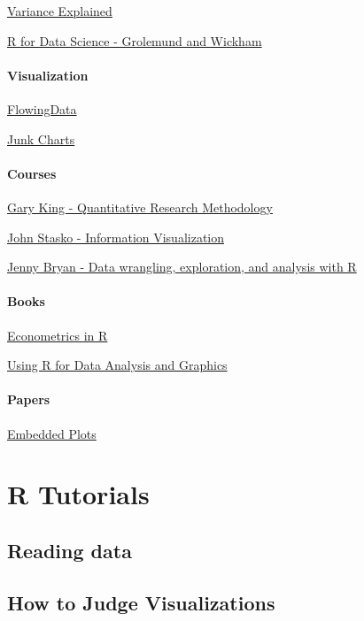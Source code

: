 \documentclass[]{book}
\begin{document}
\href{http://varianceexplained.org/RData/resources/}{Variance Explained}

\href{http://r4ds.had.co.nz/}{R for Data Science - Grolemund and
Wickham}

\subsection*{Visualization}\label{visualization}

\href{}{FlowingData}

\href{http://junkcharts.typepad.com/}{Junk Charts}

\subsection*{Courses}\label{courses}

\href{http://projects.iq.harvard.edu/gov2001/}{Gary King - Quantitative
Research Methodology}

\href{http://www.cc.gatech.edu/~stasko/7450/}{John Stasko - Information
Visualization}

\href{http://stat545.com/}{Jenny Bryan - Data wrangling, exploration,
and analysis with R}

\subsection*{Books}\label{books}

\href{https://cran.r-project.org/doc/contrib/Farnsworth-EconometricsInR.pdf}{Econometrics
in R}

\href{ftp://cran.r-project.org/pub/R/doc/contrib/usingR.pdf}{Using R for
Data Analysis and Graphics}

\subsection*{Papers}\label{papers}

\href{http://vita.had.co.nz/papers/embedded-plots.pdf}{Embedded Plots}

\part{R Tutorials}\label{part-r-tutorials}

\hypertarget{read-data}{\chapter{Reading data}\label{read-data}}

\hypertarget{trifecta}{\chapter{How to Judge
Visualizations}\label{trifecta}}


\end{document}
